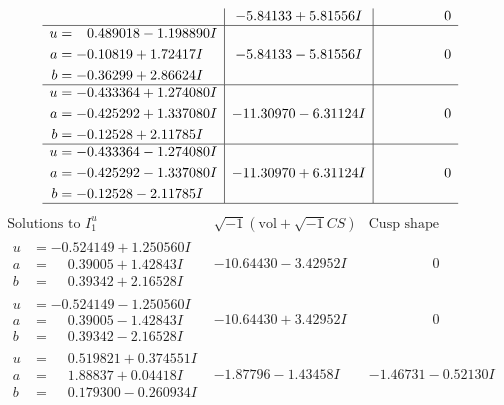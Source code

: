 \documentclass[1p]{elsarticle_modified}
\theoremstyle{definition}
\newcommand{\I}{\sqrt{-1}}
\begin{document}
$$\begin{array}{c|c|c}
 & -5.84133 + 5.81556 I & \phantom{-0.000000 } 0 \\ \hline\begin{aligned}
u &= \phantom{-}0.489018 - 1.198890 I \\
a &= -0.10819 + 1.72417 I \\
b &= -0.36299 + 2.86624 I\end{aligned}
 & -5.84133 - 5.81556 I & \phantom{-0.000000 } 0 \\ \hline\begin{aligned}
u &= -0.433364 + 1.274080 I \\
a &= -0.425292 + 1.337080 I \\
b &= -0.12528 + 2.11785 I\end{aligned}
 & -11.30970 - 6.31124 I & \phantom{-0.000000 } 0 \\ \hline\begin{aligned}
u &= -0.433364 - 1.274080 I \\
a &= -0.425292 - 1.337080 I \\
b &= -0.12528 - 2.11785 I\end{aligned}
 & -11.30970 + 6.31124 I & \phantom{-0.000000 } 0\\
 \hline 
 \end{array}$$\newpage$$\begin{array}{c|c|c}  
\text{Solutions to }I^u_{1}& \I (\text{vol} + \sqrt{-1}CS) & \text{Cusp shape}\\
 \hline 
\begin{aligned}
u &= -0.524149 + 1.250560 I \\
a &= \phantom{-}0.39005 + 1.42843 I \\
b &= \phantom{-}0.39342 + 2.16528 I\end{aligned}
 & -10.64430 - 3.42952 I & \phantom{-0.000000 } 0 \\ \hline\begin{aligned}
u &= -0.524149 - 1.250560 I \\
a &= \phantom{-}0.39005 - 1.42843 I \\
b &= \phantom{-}0.39342 - 2.16528 I\end{aligned}
 & -10.64430 + 3.42952 I & \phantom{-0.000000 } 0 \\ \hline\begin{aligned}
u &= \phantom{-}0.519821 + 0.374551 I \\
a &= \phantom{-}1.88837 + 0.04418 I \\
b &= \phantom{-}0.179300 - 0.260934 I\end{aligned}
 & -1.87796 - 1.43458 I & -1.46731 - 0.52130 I \\ \hline\begin{aligned}

\end{aligned}
\end{array}$$
\end{document}
